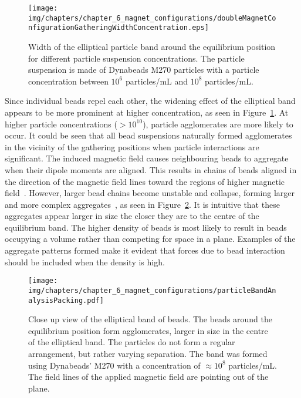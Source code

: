 \begin{figure}[htb]
   \centering
   \texttt{[image: img/chapters/chapter\_6\_magnet\_configurations/doubleMagnetConfigurationGatheringWidthConcentration.eps]}
   \caption[Elliptical equilibrium band width for different particle suspension concentrations]{Width of the elliptical particle band around the equilibrium position for different particle suspension concentrations. The particle suspension is made of Dynabeads M270 particles with a particle concentration between $10^6$ particles/mL and $10^8$ particles/mL.}
   \label{fig:doubleMagnetConfigurationGatheringWidthConcentration}
\end{figure}

Since individual beads repel each other, the widening effect of the elliptical band appears to be more prominent at higher concentration, as seen in Figure~\ref{fig:doubleMagnetConfigurationGatheringWidthConcentration}. At higher particle concentrations ($> 10^{10}$), particle agglomerates are more likely to occur. It could be seen that all bead suspensions naturally formed agglomerates in the vicinity of the gathering positions when particle interactions are significant. The induced magnetic field causes neighbouring beads to aggregate when their dipole moments are aligned. This results in chains of beads aligned in the direction of the magnetic field lines toward the regions of higher magnetic field~\cite{Yellen2005}. However, larger bead chains become unstable and collapse, forming larger and more complex aggregates~\cite{Faraudo2016}, as seen in Figure~\ref{fig:particleBandAnalysisPacking}. It is intuitive that these aggregates appear larger in size the closer they are to the centre of the equilibrium band. The higher density of beads is most likely to result in beads occupying a volume rather than competing for space in a plane. Examples of the aggregate patterns formed make it evident that forces due to bead interaction should be included when the density is high.

\begin{figure}[htb]
	\centering
	\texttt{[image: img/chapters/chapter\_6\_magnet\_configurations/particleBandAnalysisPacking.pdf]}
	\caption[Close up view of elliptical particle band]{Close up view of the elliptical band of beads. The beads around the equilibrium position form agglomerates, larger in size in the centre of the elliptical band. The particles do not form a regular arrangement, but rather varying separation. The band was formed using Dynabeads' M270 with a concentration of $\approx 10^8$ particles/mL. The field lines of the applied magnetic field are pointing out of the plane.}
	\label{fig:particleBandAnalysisPacking}
\end{figure}


